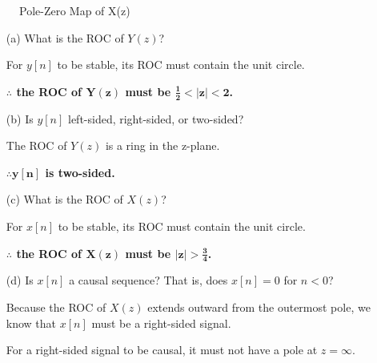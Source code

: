 \documentclass[fleqn]{article}
\begin{document}
\begin{enumerate}[nolistsep]
				\begin{figure}[H]				
				\centerline{}
				\caption{Pole-Zero Map of X(z)}
				\label{pzmap_x_z_prob_3_48}
				\end{figure}
				
				\begin{enumerate} [nolistsep]
					\item[(a)] What is the ROC of $Y(z)$?
					
						For $y[n]$ to be stable, its ROC must contain the unit circle.
						
						\textbf{$\mathbf{\therefore}$ the ROC of $\mathbf{Y(z)}$ must be $\mathbf{\frac{1}{2} < |z| < 2}$.}
						
					\item[(b)] Is $y[n]$ left-sided, right-sided, or two-sided?
					
						The ROC of $Y(z)$ is a ring in the z-plane.
						
						\textbf{$\mathbf{\therefore y[n]}$ is two-sided.}
						
					\item[(c)] What is the ROC of $X(z)$?
					
						For $x[n]$ to be stable, its ROC must contain the unit circle.
						
						\textbf{$\mathbf{\therefore}$ the ROC of $\mathbf{X(z)}$ must be $\mathbf{|z| > \frac{3}{4}}$.}
						
					\item[(d)] Is $x[n]$ a causal sequence? That is, does $x[n] = 0$ for $n < 0$?
					
						Because the ROC of $X(z)$ extends outward from the outermost pole, we know that $x[n]$ must be a right-sided signal.
						
						For a right-sided signal to be causal, it must not have a pole at $z = \infty$.
						

\end{enumerate}
\end{enumerate}
\end{document}
